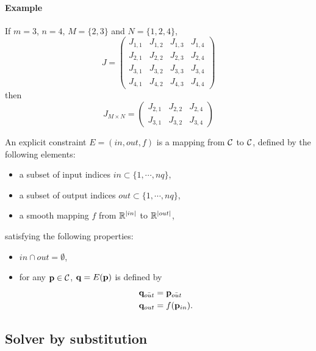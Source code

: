 \paragraph{Example}
If $m=3$, $n=4$, $M=\{2,3\}$ and $N=\{1,2,4\}$,
$$
J = \left(\begin{array}{cccc}
  J_{1,1} &   J_{1,2} &   J_{1,3} &   J_{1,4}\\
  J_{2,1} &   J_{2,2} &   J_{2,3} &   J_{2,4}\\
  J_{3,1} &   J_{3,2} &   J_{3,3} &   J_{3,4}\\
  J_{4,1} &   J_{4,2} &   J_{4,3} &   J_{4,4}
\end{array}\right)
$$
then
$$
J_{M\times N} = \left(\begin{array}{ccc}
  J_{2,1} &   J_{2,2} &   J_{2,4}\\
  J_{3,1} &   J_{3,2} &   J_{3,4}
\end{array}\right)
$$
  
\begin{definition}\label{def:Explicit}
An explicit constraint $E=(in, out, f)$ is a mapping from $\mathcal{C}$ to $\mathcal{C}$, defined by the following elements:
\begin{itemize}
\item a subset of input indices $in\subset\{1,\cdots, nq\}$,
\item a subset of output indices $out\subset\{1,\cdots, nq\}$,
\item a smooth mapping $f$ from $\mathbb{R}^{|in|}$ to $\mathbb{R}^{|out|}$,
\end{itemize}
satisfying the following properties:
\begin{itemize}
\item $in\cap out = \emptyset$,
\item for any $\mathbf{p}\in\mathcal{C}$, $\mathbf{q} = E(\mathbf{p})$ is defined by
  \begin{align*}
    &\mathbf{q}_{\bar{out}} = \mathbf{p}_{\bar{out}}\\
    &\mathbf{q}_{out} = f (\mathbf{p}_{in}).
  \end{align*}
\end{itemize}
\end{definition}

\subsection{Solver by substitution}

